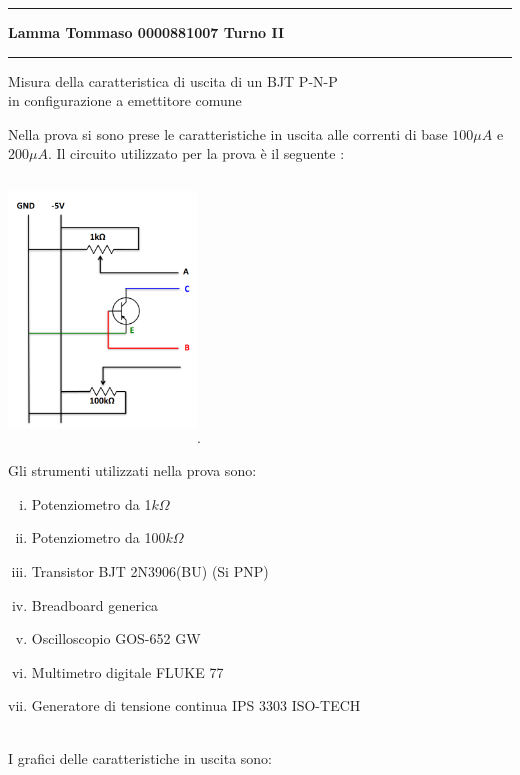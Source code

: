 \documentclass{amsart}
\begin{document}
    \hrule
    \begin{center}
        \textbf{ Lamma    Tommaso    0000881007        Turno    II }\\
    \end{center}
    \hrule
    \begin{center}
        {\huge Misura della caratteristica di uscita di un BJT P-N-P \\ in configurazione a emettitore comune}
    \end{center}
    Nella prova si sono prese le caratteristiche in uscita alle correnti di base $100 \mu A$ e $200 \mu A$.
    Il circuito utilizzato per la prova è il seguente :
    \begin{center}
        \includegraphics[width = 5cm, height = 7cm]{circuito.png}.
    \end{center}
    Gli strumenti utilizzati nella prova sono:
    \begin{enumerate}[(i)]
        \item Potenziometro da 1$k\Omega$
        \item Potenziometro da 100$k\Omega$
        \item Transistor BJT 2N3906(BU) (Si PNP) 
        \item Breadboard generica
        \item Oscilloscopio GOS-652 GW
        \item Multimetro digitale FLUKE 77
        \item Generatore di tensione continua IPS 3303 ISO-TECH
    \end{enumerate}
    \hfill \\
    I grafici delle caratteristiche in uscita sono:\\
\end{document}

